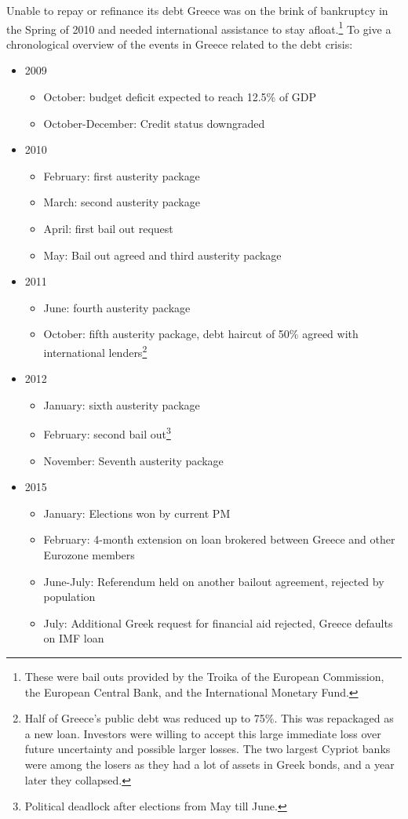 \documentclass{tufte-handout}
\begin{document}
Unable to repay or refinance its debt Greece was on the brink of bankruptcy in the Spring of 2010 and needed international assistance to stay afloat.\footnote{These were bail outs provided by the Troika of the European Commission, the European Central Bank, and the International Monetary Fund.}
To give a chronological overview of the events in Greece related to the debt crisis:
\begin{itemize}
  \item 2009
  \begin{itemize}
    \item October: budget deficit expected to reach 12.5\% of GDP
    \item October-December: Credit status downgraded     
  \end{itemize}
  \item 2010
  \begin{itemize}
    \item February: first austerity package
    \item March: second austerity package
    \item April: first bail out request
    \item May: Bail out agreed and third austerity package
  \end{itemize}
  \item 2011
  \begin{itemize}
    \item June: fourth austerity package
    \item October: fifth austerity package, debt haircut of 50\% agreed with international lenders\footnote{Half of Greece's public debt was reduced up to 75\%. This was repackaged as a new loan. Investors were willing to accept this large immediate loss over future uncertainty and possible larger losses. The two largest Cypriot banks were among the losers as they had a lot of assets in Greek bonds, and a year later they collapsed.}
  \end{itemize}
  \item 2012
  \begin{itemize}
    \item January: sixth austerity package
    \item February: second bail out\footnote{Political deadlock after elections from May till June.}
    \item November: Seventh austerity package
  \end{itemize}  
  \item 2015
  \begin{itemize}
    \item January: Elections won by current PM
    \item February: 4-month extension on loan brokered between Greece and other Eurozone members
    \item June-July: Referendum held on another bailout agreement, rejected by population
    \item July: Additional Greek request for financial aid rejected, Greece defaults on IMF loan
  \end{itemize}  
\end{itemize}
\end{document}
